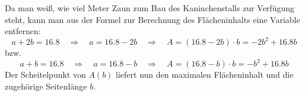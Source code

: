 \begin{exercise}
\begin{center}
    \end{center}
    Da man weiß, wie viel Meter Zaun zum Bau des
    Kaninchenstalls zur Verfügung steht, kann man
    aus der Formel zur Berechnung des Flächeninhalts
    eine Variable entfernen:
    \begin{equation*}
      a+2b=\num{16.8}
      \quad\Rightarrow\quad
      a=\num{16.8}-2b
      \quad\Rightarrow\quad
      A=\left(\num{16.8}-2b\right)\cdot b
      =-2b^2+\num{16.8}b
    \end{equation*}
    bzw.
    \begin{equation*}
      a+b=\num{16.8}
      \quad\Rightarrow\quad
      a=\num{16.8}-b
      \quad\Rightarrow\quad
      A=\left(\num{16.8}-b\right)\cdot b
      =-b^2+\num{16.8}b
    \end{equation*}
    Der Scheitelpunkt von $A(b)$ liefert
    nun den maximalen Flächeninhalt und die
    zugehörige Seitenlänge $b$.
  \fi
\end{exercise}
